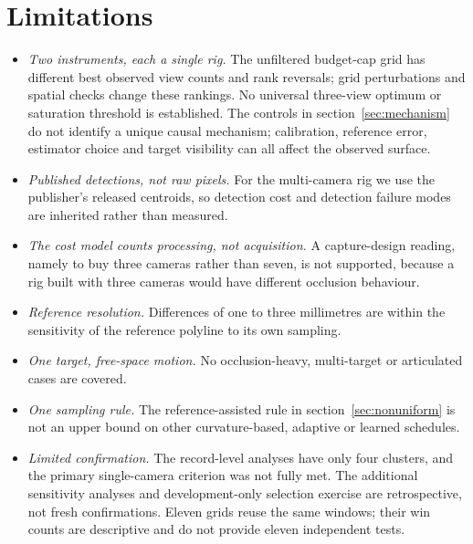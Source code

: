 \documentclass{iopjournal}
\begin{document}

\section{Limitations}
\label{sec:limitations}
\begin{itemize}
\item \textit{Two instruments, each a single rig.} The unfiltered budget-cap grid has different best observed view counts and
rank reversals; grid perturbations and spatial checks change these rankings.
No universal three-view optimum or saturation threshold is established.
The controls in section~\ref{sec:mechanism} do not identify a unique
causal mechanism; calibration, reference error, estimator choice and target
visibility can all affect the observed surface.
\item \textit{Published detections, not raw pixels.} For the multi-camera rig
we use the publisher's released centroids, so detection cost and detection
failure modes are inherited rather than measured.
\item \textit{The cost model counts processing, not acquisition.} A
capture-design reading, namely to buy three cameras rather than seven, is not
supported, because a rig built with three cameras would have different
occlusion behaviour.
\item \textit{Reference resolution.} Differences of one to three millimetres
are within the sensitivity of the reference polyline to its own sampling.
\item \textit{One target, free-space motion.} No occlusion-heavy, multi-target
or articulated cases are covered.
\item \textit{One sampling rule.} The reference-assisted rule in
section~\ref{sec:nonuniform} is not an upper bound on other curvature-based,
adaptive or learned schedules.
\item \textit{Limited confirmation.} The record-level analyses have only four
clusters, and the primary single-camera criterion was not fully met. The
additional sensitivity analyses and development-only selection exercise are
retrospective, not fresh confirmations. Eleven grids reuse the same windows;
their win counts are descriptive and do not provide eleven independent tests.
\end{itemize}

\end{document}

